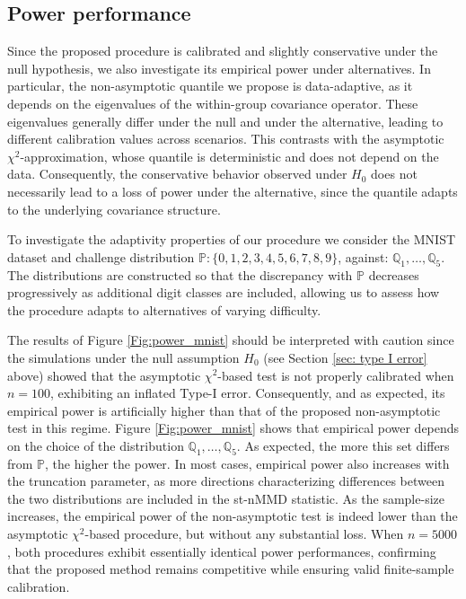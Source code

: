 \documentclass[twoside,11pt]{article}
\begin{document}
\subsection{Power performance}
Since the proposed procedure is calibrated and slightly conservative under the null hypothesis, we also investigate its empirical power under alternatives. In particular, the non-asymptotic quantile we propose is data-adaptive, as it depends on the eigenvalues of the within-group covariance operator. These eigenvalues generally differ under the null and under the alternative, leading to different calibration values across scenarios. This contrasts with the asymptotic $\chi^2$-approximation, whose quantile is deterministic and does not depend on the data. Consequently, the conservative behavior observed under $H_0$ does not necessarily lead to a loss of power under the alternative, since the quantile adapts to the underlying covariance structure.

To investigate the adaptivity properties of our procedure we consider the MNIST dataset and challenge distribution $\mathbb{P}:\{0,1,2,3,4,5,6,7,8,9\}$, against: $\mathbb{Q}_1, \hdots, \mathbb{Q}_5$. The distributions are constructed so that the discrepancy with $\mathbb{P}$ decreases progressively as additional digit classes are included, allowing us to assess how the procedure adapts to alternatives of varying difficulty.

The results of Figure \ref{Fig:power_mnist} should be interpreted with caution since the simulations under the null assumption $H_0$ (see Section \ref{sec: type I error} above) showed that the asymptotic $\chi^2$-based test is not properly calibrated when $n=100$, exhibiting an inflated Type-I error. Consequently, and as expected, its empirical power is artificially higher than that of the proposed non-asymptotic test in this regime. Figure \ref{Fig:power_mnist} shows that empirical power depends on the choice of the distribution $\mathbb{Q}_1,\ldots,\mathbb{Q}_5$. As expected, the more this set differs from $\mathbb{P}$, the higher the power. In most cases, empirical power also increases with the truncation parameter, as more directions characterizing differences between the two distributions are included in the st-nMMD statistic. As the sample-size increases, the empirical power of the non-asymptotic test is indeed lower than the  asymptotic $\chi^2$-based procedure, but without any substantial loss. When $n=5000$, both procedures exhibit essentially identical power performances, confirming that the proposed method remains competitive while ensuring valid finite-sample calibration. 
\end{document}

